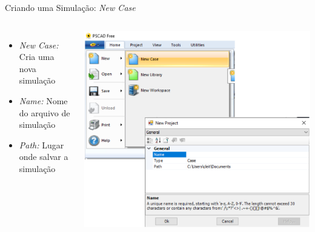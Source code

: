 \begin{frame}{Criando uma Simulação: {\it New Case}}
\centering


\begin{columns}



\begin{itemize}
\item {\it New Case:} Cria uma nova simulação
\vspace*{1cm}
\item {\it Name:} Nome do arquivo de simulação
\vspace*{1cm}
\item {\it Path:} Lugar onde salvar a simulação
\end{itemize}
\vfill


\includegraphics[width=0.95\linewidth]{./figuras/Primeiros-Passos/new_case}

\end{columns}




\end{frame}






